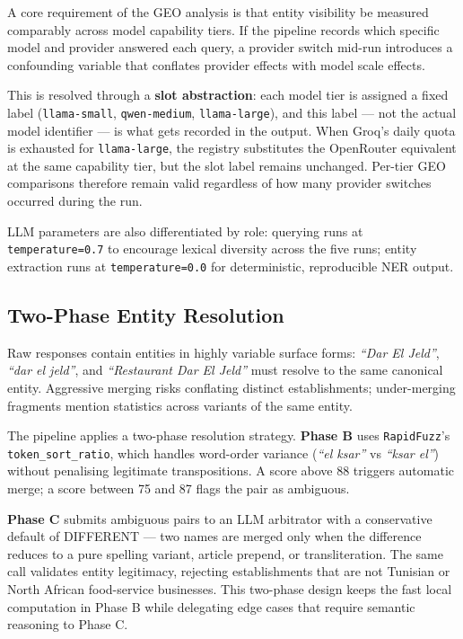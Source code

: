A core requirement of the GEO analysis is that entity visibility be measured
comparably across model capability tiers. If the pipeline records which specific
model and provider answered each query, a provider switch mid-run introduces a
confounding variable that conflates provider effects with model scale effects.

This is resolved through a \textbf{slot abstraction}: each model tier is assigned
a fixed label (\texttt{llama-small}, \texttt{qwen-medium}, \texttt{llama-large}),
and this label — not the actual model identifier — is what gets recorded in the output.
When Groq's daily quota is exhausted for \texttt{llama-large}, the registry
substitutes the OpenRouter equivalent at the same capability tier, but the slot
label remains unchanged. Per-tier GEO comparisons therefore remain valid regardless
of how many provider switches occurred during the run.

LLM parameters are also differentiated by role: querying runs at \texttt{temperature=0.7}
to encourage lexical diversity across the five runs; entity extraction runs at
\texttt{temperature=0.0} for deterministic, reproducible NER output.

\subsection{Two-Phase Entity Resolution}

Raw responses contain entities in highly variable surface forms: \textit{``Dar El Jeld''},
\textit{``dar el jeld''}, and \textit{``Restaurant Dar El Jeld''} must resolve to
the same canonical entity. Aggressive merging risks conflating distinct establishments;
under-merging fragments mention statistics across variants of the same entity.

The pipeline applies a two-phase resolution strategy.
\textbf{Phase B} uses \texttt{RapidFuzz}'s \texttt{token\_sort\_ratio}, which handles
word-order variance (\textit{``el ksar''} vs \textit{``ksar el''}) without penalising
legitimate transpositions. A score above 88 triggers automatic merge; a score between
75 and 87 flags the pair as ambiguous.

\textbf{Phase C} submits ambiguous pairs to an LLM arbitrator with a conservative
default of DIFFERENT — two names are merged only when the difference reduces to a
pure spelling variant, article prepend, or transliteration. The same call validates
entity legitimacy, rejecting establishments that are not Tunisian or North African
food-service businesses. This two-phase design keeps the fast local computation in
Phase B while delegating edge cases that require semantic reasoning to Phase C.

